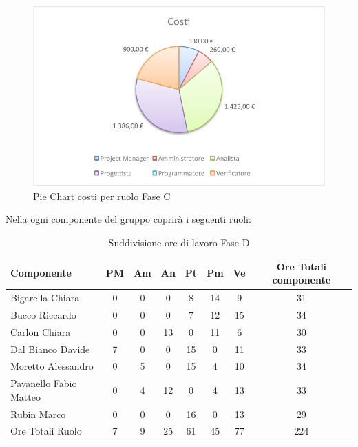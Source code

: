 				\begin{figure}[H]\centering
					\includegraphics[width=\textwidth]{PianoDiProgetto/Pics/ChartTotCostiFaseC.pdf}
					\caption{Pie Chart costi per ruolo Fase C}
				\end{figure}
				Nella  ogni componente del gruppo \groupname{} coprirà i seguenti ruoli:
				\begin{table}[H]
					\begin{center}
						\begin{tabular}{| l | c | c | c | c | c | c | c |}
							\hline
							Componente 					& PM	& Am 	& An 	& Pt 		& Pm 		& Ve 	& Ore Totali componente \\ \hline
							
							Bigarella Chiara 			& 0		& 0		& 0		& 8 		& 14 		& 9 		& 31 \\
							Bucco Riccardo 				& 0		& 0		& 0		& 7 		& 12		& 15 		& 34 \\
							Carlon Chiara	 			& 0		& 0		& 13 	& 0			& 11 		& 6 		& 30 \\
							Dal Bianco Davide 			& 7 	& 0		& 0		& 15 		& 0			& 11 		& 33 \\
							Moretto Alessandro 			& 0		& 5 	& 0		& 15 		& 4 		& 10 		& 34 \\
							Pavanello Fabio Matteo	 	& 0		& 4		& 12 	& 0			& 4 		& 13 		& 33 \\
							Rubin Marco					& 0		& 0 	& 0		& 16 		& 0			& 13 		& 29 \\ \hline \hline
							
							Ore Totali Ruolo 			& 7 	& 9 	& 25 	& 61 		& 45 		& 77 		& 224	\\ \hline
						\end{tabular}
					\end{center}
					\caption{Suddivisione ore di lavoro Fase D}
				\end{table}
